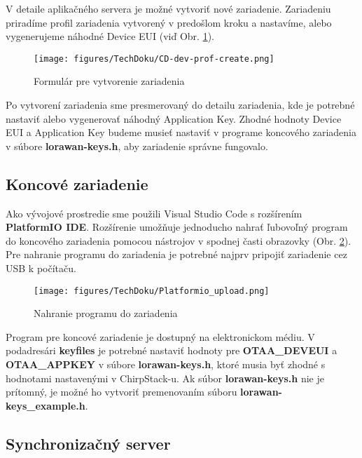 V detaile aplikačného servera je možné vytvoriť nové zariadenie. Zariadeniu priradíme profil zariadenia vytvorený v predošlom kroku a nastavíme, alebo vygenerujeme náhodné Device EUI (viď Obr. \ref{fig:tech:cs-device-create}). 

\begin{figure}[!h]
    \centering
    \texttt{[image: figures/TechDoku/CD-dev-prof-create.png]}
    \caption{Formulár pre vytvorenie zariadenia}
    \label{fig:tech:cs-device-create}
\end{figure}

Po vytvorení zariadenia sme presmerovaný do detailu zariadenia, kde je potrebné nastaviť alebo vygenerovať náhodný Application Key. Zhodné hodnoty Device EUI a Application Key budeme musieť nastaviť v programe koncového zariadenia v súbore \textbf{lorawan-keys.h}, aby zariadenie správne fungovalo.



\subsection{Koncové zariadenie}

Ako vývojové prostredie sme použili Visual Studio Code s rozšírením \textbf{PlatformIO IDE}. Rozšírenie umožňuje jednoducho nahrať ľubovoľný program do koncového zariadenia pomocou nástrojov v spodnej časti obrazovky (Obr. \ref{fig:tech:platformio_upload}). Pre nahranie programu do zariadenia je potrebné najprv pripojiť zariadenie cez USB k počítaču.

\begin{figure}[!h]
    \centering
    \texttt{[image: figures/TechDoku/Platformio\_upload.png]}
    \caption{Nahranie programu do zariadenia}
    \label{fig:tech:platformio_upload}
\end{figure}

Program pre koncové zariadenie je dostupný na elektronickom médiu. V podadresári \textbf{keyfiles}
je potrebné nastaviť hodnoty pre \textbf{OTAA\_DEVEUI} a \textbf{OTAA\_APPKEY} v súbore \textbf{lorawan-keys.h}, ktoré musia byť zhodné s hodnotami nastavenými v ChirpStack-u. Ak súbor \textbf{lorawan-keys.h} nie je prítomný, je možné ho vytvoriť premenovaním súboru \textbf{lorawan-keys\_example.h}.


\subsection{Synchronizačný server}

